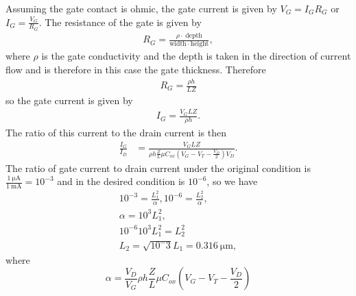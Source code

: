 \documentclass{article}
\begin{document}
Assuming the gate contact is ohmic, the gate current is given
by $V_{G} = I_{G} R_{G}$ or $I_{G} = \frac{V_{G}}{R_{G}}$. The 
resistance of the gate is given by
\begin{align*}
R_{G} = \frac{\rho \cdot ~\mathrm{depth}}{\mathrm{width} \cdot \mathrm{height}},
\end{align*}
where $\rho$ is the gate conductivity and the depth is taken in the
direction of current flow and is therefore in this case the gate 
thickness. Therefore
\begin{align*}
R_{G} = \frac{\rho h}{L Z}
\end{align*}
so the gate current is given by
\begin{align*}
I_{G} = \frac{V_{G} L Z}{\rho h}.
\end{align*}
The ratio of this current to the drain current is then
\begin{align*}
\frac{I_{G}}{I_{D}} &= \frac{V_{G} L Z}
                            {\rho h \frac{Z}{L} \mu C_{ox} (V_G - V_T - \frac{V_D}{2})V_D}.
\end{align*}
The ratio of gate current to drain current under the original condition is 
$\frac{1 ~\mathrm{\mu A}}{1 ~\mathrm{mA}} = 10^{-3}$ and in the desired condition is
$10^{-6}$, so we have
\begin{align*}
10^{-3} = \frac{L_1^2}{\alpha}, 10^{-6} = \frac{L_2^2}{\alpha}, \\
\alpha = 10^{3}L_1^2, \\
10^{-6}10^{3} L_1^2 = L_2^2 \\
L_2 = \sqrt{10^-3} L_1 = 0.316 ~\mathrm{\mu m},
\end{align*}
where 
$$
\alpha = \frac{V_D}{V_G} \rho h \frac{Z}{L} \mu C_{ox} (V_G - V_T - \frac{V_D}{2})
$$
\end{document}
